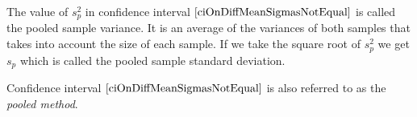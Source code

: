 
\begin{nt}
The value of $s_{p}^{2}$ in confidence interval $\ref{ciOnDiffMeanSigmasNotEqual}$
is called the pooled sample variance. 
It is an average of the variances of both samples that takes into account the  size of each sample. 
If we take the square root of $s_{p}^{2}$
we get $s_{p}$ 
which is called the pooled sample standard deviation.
\end{nt}

\noindent
Confidence interval $\ref{ciOnDiffMeanSigmasNotEqual}$
is also referred to as the \textit{pooled method}.

